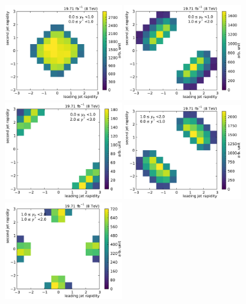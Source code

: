 \begin{figure}[htbp]
    \centering
    \includegraphics[width=0.45\textwidth]{figures/measurement/jet12_rapidity_yb0ys0.pdf}\hfill
    \includegraphics[width=0.45\textwidth]{figures/measurement/jet12_rapidity_yb0ys1.pdf}
    \includegraphics[width=0.45\textwidth]{figures/measurement/jet12_rapidity_yb0ys2.pdf}\hfill
    \includegraphics[width=0.45\textwidth]{figures/measurement/jet12_rapidity_yb1ys0.pdf}
    \includegraphics[width=0.45\textwidth]{figures/measurement/jet12_rapidity_yb1ys1.pdf}\hfill

\end{figure}
